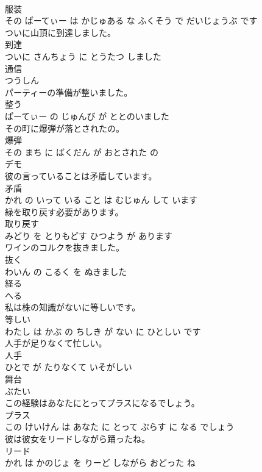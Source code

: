 \documentclass[8pt]{extreport}
\begin{document}
\begin{CJK}{UTF8}{min}
\\	服装 
\\	その ぱーてぃー は かじゅある な ふくそう で だいじょうぶ です			
\\	ついに山頂に到達しました。	
\\	到達 
\\	ついに さんちょう に とうたつ しました			
\\	通信	
\\	つうしん		
\\	パーティーの準備が整いました。	
\\	整う 
\\	ぱーてぃー の じゅんび が ととのいました			
\\	その町に爆弾が落とされたの。	
\\	爆弾 
\\	その まち に ばくだん が おとされた の			
\\	デモ	
\\	彼の言っていることは矛盾しています。	
\\	矛盾 
\\	かれ の いって いる こと は むじゅん して います			
\\	緑を取り戻す必要があります。	
\\	取り戻す 
\\	みどり を とりもどす ひつよう が あります			
\\	ワインのコルクを抜きました。	
\\	抜く 
\\	わいん の こるく を ぬきました			
\\	経る	
\\	へる		
\\	私は株の知識がないに等しいです。	
\\	等しい 
\\	わたし は かぶ の ちしき が ない に ひとしい です			
\\	人手が足りなくて忙しい。	
\\	人手 
\\	ひとで が たりなくて いそがしい			
\\	舞台	
\\	ぶたい		
\\	この経験はあなたにとってプラスになるでしょう。	
\\	プラス 
\\	この けいけん は あなた に とって ぷらす に なる でしょう			
\\	彼は彼女をリードしながら踊ったね。	
\\	リード 
\\	かれ は かのじょ を りーど しながら おどった ね			

\end{CJK}
\end{document}
